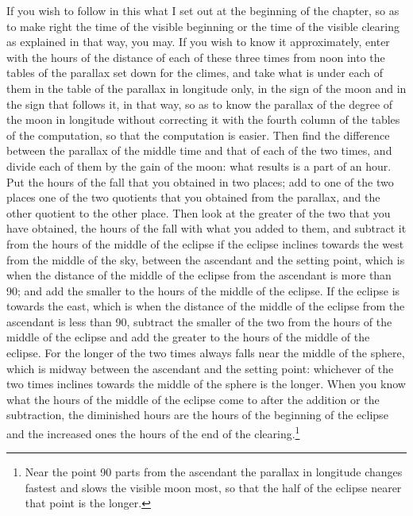 \documentclass[11pt]{article}
\newcommand{\ArPage}[1]{\marginpar{\footnotesize\color{gray}Ar.\,p.\,#1}}
\begin{document}
\par \ArPage{169}If you wish to follow in this what I set out at the beginning of the chapter, so as to make right the time of the visible beginning or the time of the visible clearing as explained in that way, you may. If you wish to know it approximately, enter with the hours of the distance of each of these three times from noon into the tables of the parallax set down for the climes, and take what is under each of them in the table of the parallax in longitude only, in the sign of the moon and in the sign that follows it, in that way, so as to know the parallax of the degree of the moon in longitude without correcting it with the fourth column of the tables of the computation, so that the computation is easier. Then find the difference between the parallax of the middle time and that of each of the two times, and divide each of them by the gain of the moon: what results is a part of an hour. Put the hours of the fall that you obtained in two places; add to one of the two places one of the two quotients that you obtained from the parallax, and the other quotient to the other place. Then look at the greater of the two that you have obtained, the hours of the fall with what you added to them, and subtract it from the hours of the middle of the eclipse if the eclipse inclines towards the west from the middle of the sky, between the ascendant and the setting point, which is when the distance of the middle of the eclipse from the ascendant is more than 90; and add the smaller to the hours of the middle of the eclipse. If the eclipse is towards the east, which is when the distance of the middle of the eclipse from the ascendant is less than 90, subtract the smaller of the two from the hours of the middle of the eclipse and add the greater to the hours of the middle of the eclipse. For the longer of the two times always falls near the middle of the sphere, which is midway between the ascendant and the setting point: whichever of the two times inclines towards the middle of the sphere is the longer. When you know what the hours of the middle of the eclipse come to after the addition or the subtraction, the diminished hours are the hours of the beginning of the eclipse and the increased ones the hours of the end of the clearing.\footnote{Near the point 90 parts from the ascendant the parallax in longitude changes fastest and slows the visible moon most, so that the half of the eclipse nearer that point is the longer.}\par
\end{document}
